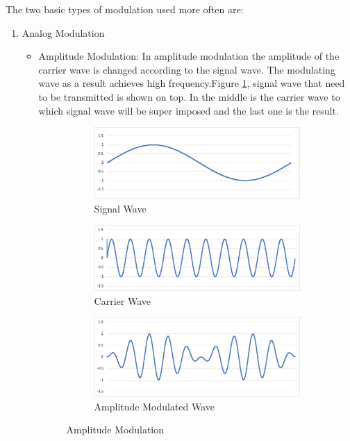 \documentclass[12pt]{article}
\begin{document}
The two basic types of modulation used more often are:
\begin{enumerate}
    \item Analog Modulation
    \begin{itemize}
        \item Amplitude Modulation: In amplitude modulation the amplitude of the carrier wave is changed according to the signal wave. The modulating wave as a result achieves high frequency.Figure \ref{Fig:Amplitude Modulation}, signal wave that need to be transmitted is shown on top. In the middle is the carrier wave to which signal wave will be super imposed and the last one is the result.
       
 \begin{figure}[H]
\begin{subfigure}[t]{\linewidth}
  \centering
  \includegraphics[width=.5\linewidth]{Images/signalWave.pdf}  
  \caption{Signal Wave}
\end{subfigure}
\begin{subfigure}[t]{\linewidth}
  \centering
  \includegraphics[width=.5\linewidth]{Images/carrierWave.pdf}  
  \caption{Carrier Wave}
  
\end{subfigure}
\begin{subfigure}[t]{\linewidth}
  \centering
  \includegraphics[width=.5\linewidth]{Images/AMwave.pdf}  
\caption{Amplitude Modulated Wave}
 \end{subfigure}
\caption{Amplitude Modulation}
 \label{Fig:Amplitude Modulation}
\end{figure}


\end{itemize}
\end{enumerate}
\end{document}
